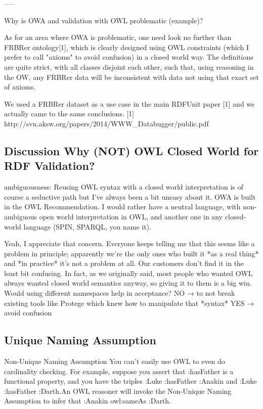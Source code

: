 \documentclass{llncs}
\begin{document}
-----

Why is OWA and validation with OWL problematic (example)?

As for an area where OWA is problematic, one need look no further than
FRBRer ontology[1], which is clearly designed using OWL constraints
(which I prefer to call "axioms" to avoid confusion) in a closed world
way. The definitions are quite strict, with all classes disjoint each
other, such that, using reasoning in the OW, any FRBRer data will be
inconsistent with data not using that exact set of axioms.

We used a FRBRer dataset as a use case in the main RDFUnit paper [1] and we actually came to the same conclusions.
[1] http://svn.aksw.org/papers/2014/WWW_Databugger/public.pdf

\subsection{Discussion Why (NOT) OWL Closed World for RDF Validation?}

ambiguousness:
Reusing OWL syntax with a closed world interpretation is of course a seductive path but I've always been a bit uneasy about it. OWA is built in the OWL Recommendation. I would rather have a neutral language, with non-ambiguous open world interpretation in OWL, and another one in any closed-world language (SPIN, SPARQL, you name it).

Yeah, I appreciate that concern. Everyone keeps telling me that this seems like a problem in principle; apparently we're the only ones who built it *as a real thing* and *in practice* it's not a problem at all. Our customers don't find it in the least bit confusing. In fact, as we originally said, most people who wanted OWL always wanted closed world semantics anyway, so giving it to them is a big win.
Would using different namespaces help in acceptance?
NO → to not break existing tools like Protege which knew how to manipulate that *syntax*
YES → avoid confusion

\subsection{Unique Naming Assumption}

Non-Unique Naming Assumption
You can't easily use OWL to even do cardinality checking. For example, suppose you assert that :hasFather is a functional property, and you have the triples :Luke :hasFather :Anakin and :Luke :hasFather :Darth.An OWL reasoner will invoke the Non-Unique Naming Assumption to infer that :Anakin owl:sameAs :Darth.
\end{document}
